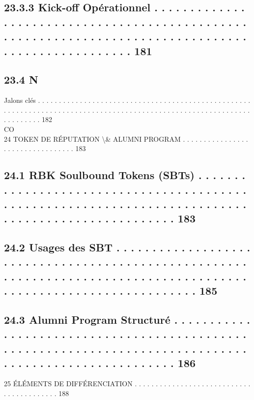 \documentclass[12pt,landscape,a4paper]{article}
\begin{document}
\subsection{23.3.3               Kick-off Opérationnel . . . . . . . . . . . . . . . . . . . . . . . . . . . . . . . . . . . . . . . . . . . . . . . . . . . . . . . . . . . . . . . . . . . . . . . . . . . . . . . . . . . . . . . . . . . . . . . . . . . 181}
\subsection{23.4                                                                            N}
Jalons clés . . . . . . . . . . . . . . . . . . . . . . . . . . . . . . . . . . . . . . . . . . . . . . . . . . . . . . . . . . . . . . . . . . . . . . . . . . . . . . . . . . . . . . . . . . . . . . . . . . . . . . . . . . . . . . . . . . . . . . . 182\\
CO\\
24    TOKEN DE RÉPUTATION \textbackslash{}& ALUMNI PROGRAM . . . . . . . . . . . . . . . . . . . . . . . . . . . . . . . . . 183\\
\subsection{24.1    RBK Soulbound Tokens (SBTs) . . . . . . . . . . . . . . . . . . . . . . . . . . . . . . . . . . . . . . . . . . . . . . . . . . . . . . . . . . . . . . . . . . . . . . . . . . . . . . . . . . . . . . . . . . . . . . . . . . . 183}
\subsection{24.2    Usages des SBT . . . . . . . . . . . . . . . . . . . . . . . . . . . . . . . . . . . . . . . . . . . . . . . . . . . . . . . . . . . . . . . . . . . . . . . . . . . . . . . . . . . . . . . . . . . . . . . . . . . . . . . . . . . . . . . . . . 185}
\subsection{24.3    Alumni Program Structuré . . . . . . . . . . . . . . . . . . . . . . . . . . . . . . . . . . . . . . . . . . . . . . . . . . . . . . . . . . . . . . . . . . . . . . . . . . . . . . . . . . . . . . . . . . . . . . . . . . . . . . . 186}
\vspace{0.5em}
25    ÉLÉMENTS DE DIFFÉRENCIATION . . . . . . . . . . . . . . . . . . . . . . . . . . . . . . . . . . . . . . . . . 188\\
\end{document}
